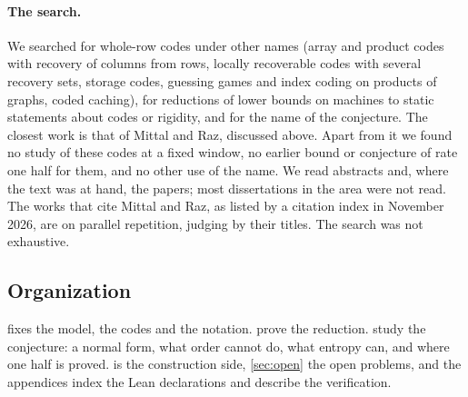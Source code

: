 \paragraph{The search.} We searched for whole-row codes under other names (array and product codes with recovery of
columns from rows, locally recoverable codes with several recovery sets, storage codes, guessing games and index
coding on products of graphs, coded caching), for reductions of lower bounds on machines to static statements about
codes or rigidity, and for the name of the conjecture. The closest work is that of Mittal and Raz, discussed above.
Apart from it we found no study of these codes at a fixed window, no earlier bound or conjecture of rate one half
for them, and no other use of the name. We read abstracts and, where the text was at hand, the papers; most
dissertations in the area were not read. The works that cite Mittal and Raz, as listed by a citation index in
November 2026, are on parallel repetition, judging by their titles. The search was not exhaustive.

\subsection{Organization}\label{sec:intro-org}

 fixes the model, the codes and the notation.  prove the reduction.
 study the conjecture: a normal form, what order cannot do, what
entropy can, and where one half is proved.  is the construction side, \cref{sec:open} the open
problems, and the appendices index the Lean declarations and describe the verification.
